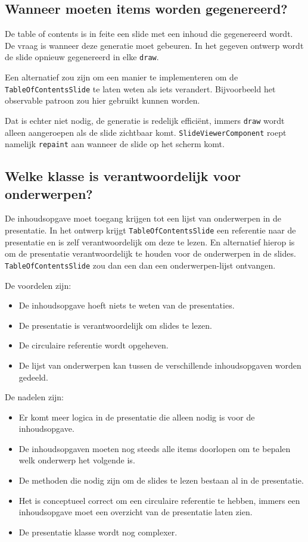 \documentclass[a4paper]{article}
\newcommand{\question}[1]{
  \subsection{#1}
}
\newcommand{\code}[1]{\lstinline[columns=fixed]{#1}}
\begin{document}
    \question{Wanneer moeten items worden gegenereerd?}
    De table of contents is in feite een slide met een inhoud die gegenereerd wordt.
    De vraag is wanneer deze generatie moet gebeuren.
    In het gegeven ontwerp wordt de slide opnieuw gegenereerd in elke \code{draw}.
    
    Een alternatief zou zijn om een manier te implementeren om de \code{TableOf}\-\code{ContentsSlide} te laten weten als iets verandert.
    Bijvoorbeeld het observable patroon zou hier gebruikt kunnen worden.
    
    Dat is echter niet nodig, de generatie is redelijk efficiënt, immers \code{draw} wordt alleen aangeroepen als de slide zichtbaar komt.
    \code{SlideViewerComponent} roept namelijk \code{repaint} aan wanneer de slide op het scherm komt.
    
    \question{Welke klasse is verantwoordelijk voor onderwerpen?}
    De inhoudsopgave moet toegang krijgen tot een lijst van onderwerpen in de presentatie.
    In het ontwerp krijgt \code{TableOfContentsSlide} een referentie naar de presentatie en is zelf verantwoordelijk om deze te lezen.
    En alternatief hierop is om de presentatie verantwoordelijk te houden voor de onderwerpen in de slides.
    \code{TableOfContentsSlide} zou dan een dan een onderwerpen-lijst ontvangen.

    De voordelen zijn:
    \begin{itemize}
        \item De inhoudsopgave hoeft niets te weten van de presentaties.
        \item De presentatie is verantwoordelijk om slides te lezen.
        \item De circulaire referentie wordt opgeheven.
        \item De lijst van onderwerpen kan tussen de verschillende inhoudsopgaven worden gedeeld.
    \end{itemize}

    De nadelen zijn:
    \begin{itemize}
        \item Er komt meer logica in de presentatie die alleen nodig is voor de in\-houds\-op\-gave.
        \item De inhoudsopgaven moeten nog steeds alle items doorlopen om te bepalen welk onderwerp het volgende is.
        \item De methoden die nodig zijn om de slides te lezen bestaan al in de presentatie.
        \item Het is conceptueel correct om een circulaire referentie te hebben, immers een inhoudsopgave moet een overzicht van de presentatie laten zien.
        \item De presentatie klasse wordt nog complexer.
    \end{itemize}
    
\end{document}
